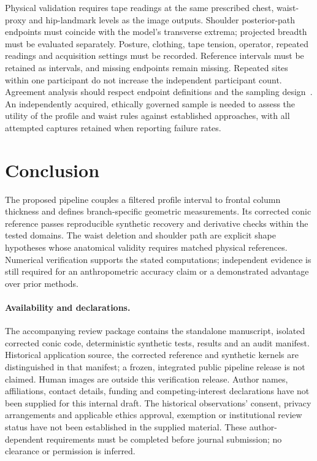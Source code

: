 \documentclass[11pt,a4paper]{article}
\begin{document}
Physical validation requires tape readings at the same prescribed chest, waist-proxy and hip-landmark levels as the image outputs. Shoulder posterior-path endpoints must coincide with the model's transverse extrema; projected breadth must be evaluated separately. Posture, clothing, tape tension, operator, repeated readings and acquisition settings must be recorded. Reference intervals must be retained as intervals, and missing endpoints remain missing. Repeated sites within one participant do not increase the independent participant count. Agreement analysis should respect endpoint definitions and the sampling design~\cite{bland1986}. An independently acquired, ethically governed sample is needed to assess the utility of the profile and waist rules against established approaches, with all attempted captures retained when reporting failure rates.

\section{Conclusion}
The proposed pipeline couples a filtered profile interval to frontal column thickness and defines branch-specific geometric measurements. Its corrected conic reference passes reproducible synthetic recovery and derivative checks within the tested domains. The waist deletion and shoulder path are explicit shape hypotheses whose anatomical validity requires matched physical references. Numerical verification supports the stated computations; independent evidence is still required for an anthropometric accuracy claim or a demonstrated advantage over prior methods.

\paragraph{Availability and declarations.}
The accompanying review package contains the standalone manuscript, isolated corrected conic code, deterministic synthetic tests, results and an audit manifest. Historical application source, the corrected reference and synthetic kernels are distinguished in that manifest; a frozen, integrated public pipeline release is not claimed. Human images are outside this verification release. Author names, affiliations, contact details, funding and competing-interest declarations have not been supplied for this internal draft. The historical observations' consent, privacy arrangements and applicable ethics approval, exemption or institutional review status have not been established in the supplied material. These author-dependent requirements must be completed before journal submission; no clearance or permission is inferred.
\end{document}
